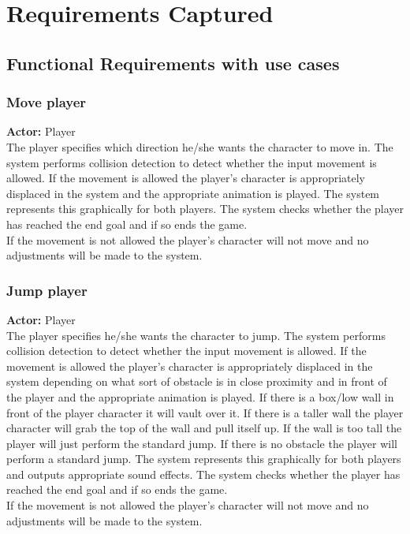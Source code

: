 \documentclass[11pt,a4paper]{article}
\begin{document}
\section{Requirements Captured}
\subsection{Functional Requirements with use cases}
\subsubsection{Move player}
\textbf{Actor:} Player\smallskip\\
The player specifies which direction he/she wants the character to move in. The system performs collision detection to detect whether the input movement is allowed. If the movement is allowed the player's character is appropriately displaced in the system and the appropriate animation is played. The system represents this graphically for both players. The system checks whether the player has reached the end goal and if so ends the game.\smallskip\\
If the movement is not allowed the player's character will not move and no adjustments will be made to the system.

\subsubsection{Jump player}
\textbf{Actor:} Player\smallskip\\
The player specifies he/she wants the character to jump. The system performs collision detection to detect whether the input movement is allowed. If the movement is allowed the player's character is appropriately displaced in the system depending on what sort of obstacle is in close proximity and in front of the player and the appropriate animation is played. If there is a box/low wall in front of the player character it will vault over it. If there is a taller wall the player character will grab the top of the wall and pull itself up. If the wall is too tall the player will just perform the standard jump. If there is no obstacle the player will perform a standard jump. The system represents this graphically for both players and outputs appropriate sound effects. The system checks whether the player has reached the end goal and if so ends the game.\smallskip\\
If the movement is not allowed the player's character will not move and no adjustments will be made to the system.
\end{document}
